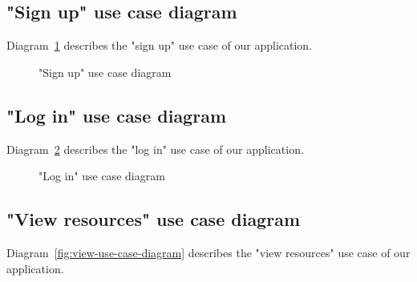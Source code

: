 \subsection{"Sign up" use case diagram}
Diagram~\ref{fig:signup-use-case-diagram} describes the "sign up" use case of our application.

\begin{figure}[H]
	\centerfloat

	\caption{"Sign up" use case diagram}
	\label{fig:signup-use-case-diagram}
\end{figure}

\subsection{"Log in" use case diagram}
Diagram~\ref{fig:login-use-case-diagram} describes the "log in" use case of our application.

\begin{figure}[H]
	\centerfloat

	\caption{"Log in" use case diagram}
	\label{fig:login-use-case-diagram}
\end{figure}

\subsection{"View resources" use case diagram}
Diagram~\ref{fig:view-use-case-diagram} describes the "view resources" use case of our application.

